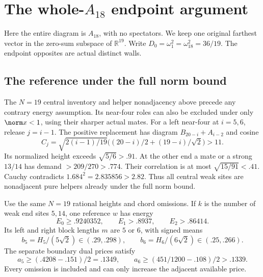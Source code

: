 
\section{The whole-\(A_{18}\) endpoint argument}
\label{app:wholeA18}
Here the entire diagram is \(A_{18}\), with no spectators.
We keep one original farthest vector in the zero-sum
subspace of \(\mathbb R^{19}\).
Write \(D_0=\omega_1^2=\omega_{18}^2=36/19\).
The endpoint opposites are actual distinct walls.

\subsection{The reference under the full norm bound}
The \(N=19\) central inventory and helper nonadjacency
above precede any contrary energy assumption.
Its near-four roles can also be excluded under
only \(\norm x<1\), using their sharper actual mates.
For a left near-four at \(i=5,6\), release \(j=i-1\).
The positive replacement has diagram
\(B_{20-i}+A_{i-2}\) and cosine
\[
 C_j=\sqrt{2(i-1)/19}
     \bigl((20-i)/2+(19-i)/\sqrt2\bigr)>11.
\]
Its normalized height exceeds \(\sqrt{5/6}>.91\).
At the other end a mate or a strong \(13/14\)
has demand \(>209/270>.774\).
Their correlation is at most
\(\sqrt{15/91}<.41\).
Cauchy contradicts \(1.684^2=2.835856>2.82\).
Thus all central weak sites are nonadjacent pure
helpers already under the full norm bound.

Use the same \(N=19\) rational heights and chord
omissions. If \(k\) is the number of weak end
sites \(5,14\), one reference \(w\) has energy
\[
 E_0\geq.9240352,\qquad E_1>.8937,\qquad E_2>.86414.
\]
Its left and right block lengths \(m\) are \(5\)
or \(6\), with signed means
\[
 b_5=H_5/(5\sqrt2)\in(.29,.298),\qquad
 b_6=H_6/(6\sqrt2)\in(.25,.266).
\]
The separate boundary dual prices satisfy
\[
 a_5\geq(.4208-.151)/2=.1349,\qquad
 a_6\geq(451/1200-.108)/2>.1339.
\]
Every omission is included and can only increase
the adjacent available price.

